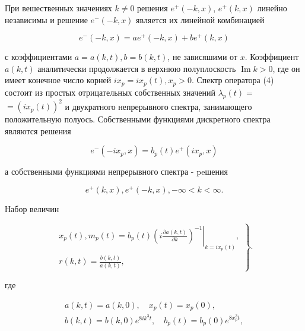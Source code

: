 \documentclass[10pt]{article}
\begin{document}
При вешественных значениях $k \neq 0$ решения $e^{+}(-k, x)$, $e^{+}(k, x)$ линейно независимы и решение $e^{-}(-k, x)$ является их линейной комбинацией



\[

e^{-}(-k, x)=a e^{+}(-k, x)+b e^{+}(k, x)

\]



с коэффициентами $a=a(k, t), b=b(k, t)$, не зависяшими от $x$. Коэффициент $a(k, t)$ аналитически продолжается в верхнюю полуплоскость $\operatorname{Im} k>0$, где он имеет конечное число корней $i x_{p}=i x_{p}(t), x_{p}>0$. Спектр оператора (4) состоит из простых отрицательных собственных значений $\lambda_{p}(t)=$ $=\left(i x_{p}(t)\right)^{2}$ и двукратного непрерывного спектра, занимающего положительную полуось. Собственными функциями дискретного спектра являются решения



\[

e^{-}\left(-i x_{p}, x\right)=b_{p}(t) e^{+}\left(i x_{p}, x\right)

\]



а собственными функциями непрерывного спектра - peшения



\[

e^{+}(k, x), e^{+}(-k, x),-\infty<k<\infty .

\]



Набор величин



\[

\left.\begin{array}{c}

x_{p}(t), m_{p}(t)=\left.b_{p}(t)\left(i \frac{\partial a(k, t)}{\partial k}\right)^{-1}\right|_{k=i x_{p}(t)}, \\

r(k, t)=\frac{b(k, t)}{a(k, t)},

\end{array}\right\} .

\]



где



\[

\begin{gathered}

a(k, t)=a(k, 0), \quad x_{p}(t)=x_{p}(0), \\

b(k, t)=b(k, 0) e^{8 i k^{3} t}, \quad b_{p}(t)=b_{p}(0) e^{8 x_{p}^{3} t},

\end{gathered}

\]
\end{document}
